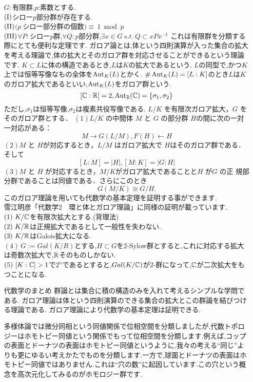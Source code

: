 \thm[シローの定理]
$G:$有限群,$p$:素数とする.\\
$\rm (I)$シロー$p$部分群が存在する.\\
$\rm (II)$$(p\ $シロー部分群の個数$)\equiv\ 1 \bmod p$\\
$\rm (III)$$\forall P:シローp$群,$\forall Q:p$部分群,$\exists x\in G\  s.t. \ Q\subset xPx^{-1}$
\thmx
これは有限群を分類する際にとても便利な定理です.
ガロア論とは,体という四則演算が入った集合の拡大を考える理論で,体の拡大とそのガロア群を対応させることができるという理論です.
$K \subset L$に体の構造であるとき,$L$は$K$の拡大であるという.
{}
$L$の同型で,かつ$K$上では恒等写像なもの全体を$\mathop{\mathrm{Aut}}\nolimits_K(L)$とかく.
$\# \mathop{\mathrm{Aut}}\nolimits_K(L)=[L:K]$のとき$L$は$K$のガロア拡大であるといい,$\mathop{\mathrm{Aut}}\nolimits_K(L)$をガロア群という.
\ex
\[
[\mathbb C:\mathbb R]=2,\mathop{\mathrm{Aut}}\nolimits_\mathbb R(\mathbb C) = \{\sigma_1,\sigma_2\}
\]
ただし,$\sigma_1$は恒等写像,$\sigma_2$は複素共役写像である.
\exx
\thm
$L/K$ を有限次ガロア拡大，$G$ をそのガロア群とする．
$(1)L/K$ の中間体 $M$ と $G$ の部分群 $H$の間に次の一対一対応がある：
\[
M \rightarrow G(L/M) , F(H) \leftarrow H
\]
$(2) M$ と $H $が対応するとき，$L/M$ はガロア拡大で $H$はそのガロア群である．
そして
\[
[L : M] = |H|, [M : K] = |G : H|
\]
$(3) M$ と $H$ が対応するとき，$M/K$がガロア拡大であることと$H$ が$G$ の正
規部分群であることは同値である．さらにこのとき
\[
G(M/K) \cong G/H. 
\]
\thmx
このガロア理論を用いても代数学の基本定理を証明する事ができます.
\proof[Galois理論による証明のポイント]
\leavevmode\\
雪江明彦「代数学2　環と体とガロア理論」に同様の証明が載っています.\\
$(1)\ K/\C$を有限次拡大とする.(背理法)\\
$(2)\ K/\R$は正規拡大であるとして一般性を失わない.\\
$(3)\ K/\mathbb R$はGalois拡大になる.\\
$(4)\ G:=Gal(K/R)$とする,$H\subset G$を2-Sylow群とすると,これに対応する拡大は奇数次拡大で,$\mathbb R$そのものしかない.\\
$(5)\ [K:\C]>1$で$2^n$であるとすると,$Gal(K/\mathbb C)$が2-群になって,$\mathbb C$が二次拡大をもつことになる.\\
\proofx
\begin{itembox}[l]{代数学のまとめ}
群論とは集合に積の構造のみを入れて考えるシンプルな学問である.
ガロア理論は体という四則演算のできる集合の拡大とこの群論を結びつける理論である.
ガロア理論により代数学の基本定理は証明できる.
\end{itembox}
多様体論では微分同相という同値関係で位相空間を分類しましたが,代数トポロジーはホモトピー同値という関係でもって位相空間を分類します.例えば,コップの表面とドーナツの表面はホモトピー同値というように,我々の考える``同じ''よりも更にゆるい考えかたでものを分類します.一方で,球面とドーナツの表面はホモトピー同値ではありません.これは``穴の数''に起因しています.この穴という概念を高次元化してみるのがホモロジー群です.
